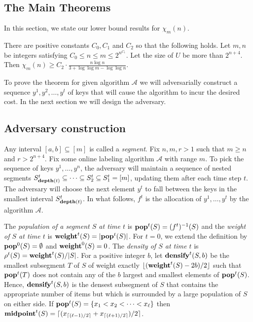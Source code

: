 \documentclass[runningheads,a4paper]{llncs}
\newcommand{\A}{\mathcal{A}}
\newcommand{\thmA}{{C_0}}
\newcommand{\thmB}{{C_1}}
\newcommand{\thmC}{{C_2}}
\newcommand{\pop}{{\rm {\bf pop}}}
\newcommand{\weight}{{\rm {\bf weight}}}
\newcommand{\midp}{{\rm {\bf midpoint}}}
\newcommand{\depth}{{\rm {\bf depth}}}
\newcommand{\densify}{{\rm {\bf densify}}}
\begin{document}
\subsection{The Main Theorems}
\label{subsec:main theorem}
In this section, we state our lower bound results for  $\chi_m(n)$.   

\begin{theorem}
\label{thm:main}
There are positive constants $\thmA, \thmB$ and $\thmC$ so that the following holds. Let $m,n$ be integers satisfying
$\thmA \leq n \le m \le 2^{n^\thmB}$. Let the size of $U$ be more than $2^{n+4}$. 
Then $\chi_m(n) \geq \thmC \cdot \frac{n \log n}{3 + \log \log m - \log \log n}$.
\end{theorem}


To prove the theorem for given algorithm $\A$ we will adversarially construct a sequence $y^1,y^2,\dots,y^t$ of keys that will cause
the algorithm to incur the desired cost. In the next section we will design the adversary.

\subsection{Adversary construction}

Any interval $[a,b]\subseteq [m]$ is called a \emph{segment}. Fix $n,m,r>1$ such that $m\ge n$ and $r>2^{n+4}$.
Fix some online labeling algorithm $\A$ with range $m$. 
To pick the sequence of keys $y^1,\dots,y^n$, the adversary will maintain a sequence of 
nested segments $S^t_{\depth(t)} \subseteq \cdots \subseteq S^t_2 \subseteq S^t_1 = [m]$, updating them after each time step $t$. 
The adversary will choose the next element $y^{t}$ to fall between the keys in
the smallest interval $S^t_{\depth(t)}$. In what follows, $f^t$ is the allocation of $y^1,\dots,y^t$ by the algorithm $\A$.

The \emph{population of a segment $S$ at time $t$} is $\pop^t(S) = (f^t)^{-1}(S)$ and the 
\emph{weight of $S$ at time $t$} is $\weight^t(S) = |\pop^t(S)|$. 
For $t=0$, we extend the definition by $\pop^0(S) = \emptyset$ and $\weight^0(S) = 0$.  
The \emph{density of $S$ at time $t$} is $\rho^t(S) = \weight^t(S) / |S|$. For a positive 
integer $b$, let $\densify^t(S,b)$ be the smallest subsegment $T$ of $S$ of weight exactly 
$\lfloor (\weight^t(S) - 2b) / 2 \rfloor$ such that $\pop^t(T)$ does not contain any of the $b$ largest 
and smallest elements of $\pop^t(S)$. Hence, $\densify^t(S,b)$ is the densest subsegment of $S$ that contains 
the appropriate number of items but which is surrounded by a large population of $S$ on either side.
If $\pop^t(S)=\{x_1<x_2 <\cdots <x_\ell\}$ then $\midp^t(S)= \lceil (x_{\lceil (\ell-1)/2 \rceil} + x_{\lceil (\ell+1)/2 \rceil} )/ 2 \rceil$.
\end{document}
